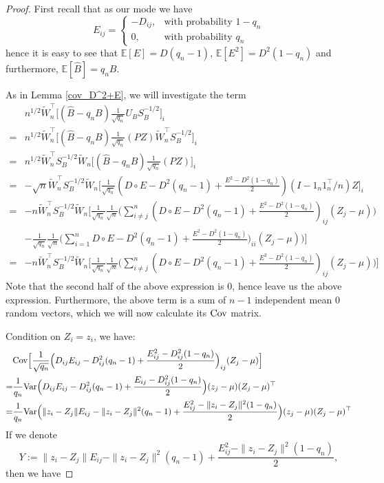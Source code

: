 \begin{proof}
First recall that as our mode we have
\[
    E_{ij} =
    \begin{cases}
        -D_{ij}, & \text{with probability } 1-q_n\\
        0, & \text{with probability } q_n
       \end{cases} 
\]
hence it is easy to see that $\mathbb{E}[E] = D (q_n -1 )$, $\mathbb{E}[E^2] = D^2(1-q_n)$ and furthermore, $\mathbb{E}[\hat{B}] = q_n B.$
 
As in Lemma \ref{cov_D^2+E}, we will investigate the term
  \begin{align*}
   & n^{1/2} \tilde{W}_n^\top \Big[(\hat{B} - q_n B) \frac{1}{\sqrt{q_n}} U_B S_B^{-1/2} \Big]_{i} \\
  = & {n}^{1/2} \tilde{W}_n^\top \Big[ (\hat{B} - q_n B) \frac{1}{\sqrt{q_n}} (PZ) \tilde{W}_n^\top S_B^{-1/2} \Big]_{i} \\
  = & {n}^{1/2} \tilde{W}_n^\top S_B^{-1/2} \tilde{W}_n \Big[ (\hat{B} - q_n B) \frac{1}{\sqrt{q_n}} (PZ) \Big]_{i} \\
  = & -\sqrt{n} \tilde{W}_n^\top S_B^{-1/2} \tilde{W}_n \Big[\frac{1}{\sqrt{q_n}} (D \circ E - D^2(q_n -1)  + \frac{E^2 - D^2(1-q_n)}{2} ) (I - 1_n 1_n^\top/n)Z  \Big]_{i}\\
  = & -n \tilde{W}_n^\top S_B^{-1/2} \tilde{W}_n \Big[ \frac{1}{\sqrt{q_n}} \frac{1}{\sqrt{n}} \Big( \sum\limits_{i \neq j}^{n} (D \circ E - D^2(q_n -1) + \frac{E^2 - D^2(1-q_n)}{2} )_{ij} (Z_j - \mu) \Big) \\
  & - \frac{1}{\sqrt{q_n}} \frac{1}{\sqrt{n}} \Big( \sum\limits_{i =1}^{n} D \circ E - D^2(q_n -1) + \frac{E^2 - D^2(1-q_n)}{2} )_{ii} (Z_j - \mu) \Big) \Big] \\
  = & -n \tilde{W}_n^\top S_B^{-1/2} \tilde{W}_n \Big[ \frac{1}{\sqrt{q_n}} \frac{1}{\sqrt{n}} \Big( \sum\limits_{i \neq j}^{n} (D \circ E - D^2(q_n -1) + \frac{E^2 - D^2(1-q_n)}{2} )_{ij} (Z_j - \mu) \Big) \Big]
  \end{align*}
  Note that the second half of the above expression is $0$, hence leave us the above expression. Furthermore, the above term is a sum of $n-1$ independent mean 0 random vectors, which we will now calculate its $\mathrm{Cov}$ matrix.
  
 Condition on $Z_i = z_i$, we have:
 \begin{align*}
 & \mathrm{Cov} \Big[ \frac{1}{\sqrt{q_n}}   \Big(D_{ij}  E_{ij} - D_{ij}^2(q_n -1) + \frac{E_{ij}^2 - D_{ij}^2(1-q_n)}{2} \Big)_{ij} (Z_j - \mu)  \Big]\\
 = & \frac{1}{q_n} \mathrm{Var} \Big(  D_{ij}E_{ij} - D_{ij}^2(q_n-1) + \frac{E_{ij} - D_{ij}^2(1-q_n)}{2}  \Big) (z_j-\mu) (Z_j -\mu)^\top \\
 = & \frac{1}{q_n} \mathrm{Var} \Big(  \|z_i - Z_j \|E_{ij} - \|z_i - Z_j \|^2 (q_n -1) + \frac{E_{ij}^2 - \|z_i - Z_j\|^2 (1-q_n)}{2} \Big) (z_j-\mu) (Z_j -\mu)^\top
 \end{align*}
 If we denote $$ Y := \|z_i - Z_j \|E_{ij} - \|z_i - Z_j \|^2 (q_n -1) + \frac{E_{ij}^2 - \|z_i - Z_j\|^2 (1-q_n)}{2},$$ then we have
 


\end{proof}
